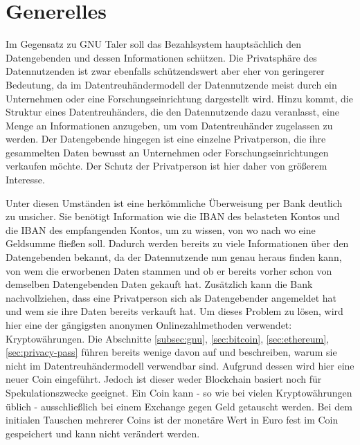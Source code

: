 \documentclass[11pt,a4paper]{scrreprt}
\begin{document}
 

\section{Generelles}
Im Gegensatz zu GNU Taler soll das Bezahlsystem hauptsächlich den Datengebenden und dessen Informationen schützen. Die Privatsphäre des Datennutzenden ist zwar ebenfalls schützendswert aber eher von geringerer Bedeutung, da im Datentreuhändermodell der Datennutzende meist durch ein Unternehmen oder eine Forschungseinrichtung dargestellt wird. Hinzu kommt, die Struktur eines Datentreuhänders, die den Datennutzende dazu veranlasst, eine Menge an Informationen anzugeben, um vom Datentreuhänder zugelassen zu werden. Der Datengebende hingegen ist eine einzelne Privatperson, die ihre gesammelten Daten bewusst an Unternehmen oder Forschungseinrichtungen verkaufen möchte. Der Schutz der Privatperson ist hier daher von größerem Interesse. 

Unter diesen Umständen ist eine herkömmliche Überweisung per Bank deutlich zu unsicher. Sie benötigt Information wie die IBAN des belasteten Kontos und die IBAN des empfangenden Kontos, um zu wissen, von wo nach wo eine Geldsumme fließen soll. Dadurch werden bereits zu viele Informationen über den Datengebenden bekannt, da der Datennutzende nun genau heraus finden kann, von wem die erworbenen Daten stammen und ob er bereits vorher schon von demselben Datengebenden Daten gekauft hat. Zusätzlich kann die Bank nachvollziehen, dass eine Privatperson sich als Datengebender angemeldet hat und wem sie ihre Daten bereits verkauft hat.
Um dieses Problem zu lösen, wird hier eine der gängigsten anonymen Onlinezahlmethoden verwendet: Kryptowährungen. Die Abschnitte \ref{subsec:gnu}, \ref{sec:bitcoin}, \ref{sec:ethereum}, \ref{sec:privacy-pass} führen bereits wenige davon auf und beschreiben, warum sie nicht im Datentreuhändermodell verwendbar sind. Aufgrund dessen wird hier eine neuer Coin eingeführt. Jedoch ist dieser weder Blockchain basiert noch für Spekulationszwecke geeignet. Ein Coin kann - so wie bei vielen Kryptowährungen üblich - ausschließlich bei einem Exchange gegen Geld getauscht werden. Bei dem initialen Tauschen mehrerer Coins ist der monetäre Wert in Euro fest im Coin gespeichert und kann nicht verändert werden. 
\end{document}
